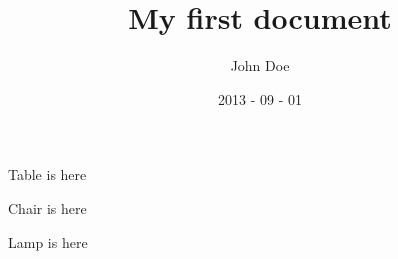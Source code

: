 \documentclass{article}
\title{ My first document }
\date{ 2013 - 09 - 01 }
\author{ John Doe }
\begin{document}
\maketitle
\newpage
\begin{center}
Table is here
\end{center}
\begin{center}
Chair is here
\end{center}
\begin{center}
Lamp is here
\end{center}
\end{document}

